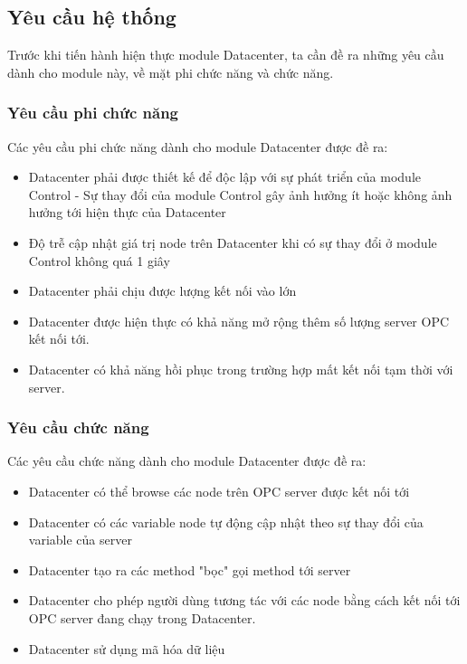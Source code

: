 \subsection{Yêu cầu hệ thống}

Trước khi tiến hành hiện thực module Datacenter, ta cần đề ra những yêu cầu dành cho module này, về mặt phi chức năng và chức năng.

\subsubsection{Yêu cầu phi chức năng}

Các yêu cầu phi chức năng dành cho module Datacenter được đề ra:


\begin{itemize}
    \item Datacenter phải được thiết kế để độc lập với sự phát triển của module Control - Sự thay đổi của module Control gây ảnh hưởng ít hoặc không ảnh hưởng tới hiện thực của Datacenter
    \item Độ trễ cập nhật giá trị node trên Datacenter khi có sự thay đổi ở module Control không quá 1 giây
    \item Datacenter phải chịu được lượng kết nối vào lớn
    \item Datacenter được hiện thực có khả năng mở rộng thêm số lượng server OPC kết nối tới.
    \item Datacenter có khả năng hồi phục trong trường hợp mất kết nối tạm thời với server.
\end{itemize}

\subsubsection{Yêu cầu chức năng}

Các yêu cầu chức năng dành cho module Datacenter được đề ra:

\begin{itemize}
    \item Datacenter có thể browse các node trên OPC server được kết nối tới
    \item Datacenter có các variable node tự động cập nhật theo sự thay đổi của variable của server
    \item Datacenter tạo ra các method "bọc" gọi method tới server
    \item Datacenter cho phép người dùng tương tác với các node bằng cách kết nối tới OPC server đang chạy trong Datacenter.
    \item Datacenter sử dụng mã hóa dữ liệu 
\end{itemize}

